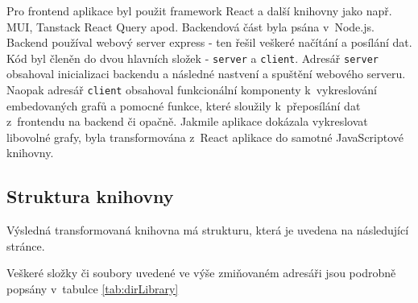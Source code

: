 \documentclass[czech, bc, kiv, he, iso690numb]{fasthesis}
\begin{document}
Pro frontend aplikace byl použit framework React a další knihovny jako např. MUI, Tanstack React Query apod. Backendová část byla psána v~Node.js. Backend používal webový server express - ten
řešil veškeré načítání a posílání dat. Kód byl členěn do dvou hlavních složek - \texttt{server} a \texttt{client}. Adresář \texttt{server} obsahoval inicializaci backendu a následné nastvení a spuštění webového serveru. Naopak
adresář \texttt{client} obsahoval funkcionální komponenty k~vykreslování embedovaných grafů a pomocné funkce, které sloužily k~přeposílání dat z~frontendu na backend či opačně. Jakmile aplikace
dokázala vykreslovat libovolné grafy, byla transformována z~React aplikace do samotné JavaScriptové knihovny.

\subsection{Struktura knihovny}

Výsledná transformovaná knihovna má strukturu, která je uvedena na následující stránce.


Veškeré složky či soubory uvedené ve výše zmiňovaném adresáři jsou podrobně popsány v~tabulce \ref{tab:dirLibrary}
\end{document}
